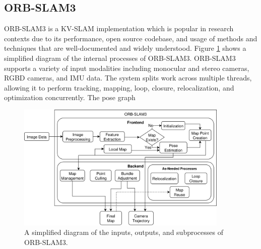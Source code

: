 \subsection{ORB-SLAM3}

ORB-SLAM3 is a KV-SLAM implementation which is popular in research contexts due to its performance, open source codebase, and usage of methods and techniques that are well-documented and widely understood. Figure \ref{fig:orb-slam3} shows a simplified diagram of the internal processes of ORB-SLAM3. ORB-SLAM3 supports a variety of input modalities including monocular and stereo cameras, RGBD cameras, and IMU data. The system splits work across multiple threads, allowing it to perform tracking, mapping, loop, closure, relocalization, and optimization concurrently. The pose graph

\begin{figure}[!ht]
    \centering
    \includegraphics[width=0.9\textwidth]{resources/orb-slam3.png}
    \caption[Simplified ORB-SLAM3 Operational Diagram]{A simplified diagram of the inputs, outputs, and subprocesses of ORB-SLAM3.}
    \label{fig:orb-slam3}
\end{figure}